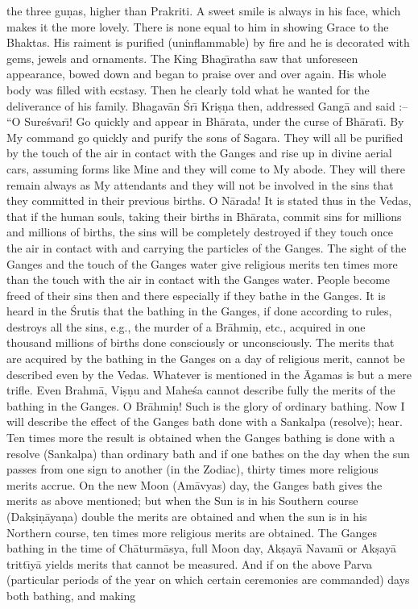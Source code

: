 the three gu\d{n}as, higher than Prakriti. A sweet smile is always in his face, which makes it the more lovely. There is none equal to him in showing Grace to the Bhaktas. His raiment is purified (uninflammable) by fire and he is decorated with gems, jewels and ornaments. The King Bhag\={\i}ratha saw that unforeseen appearance, bowed down and began to praise over and over again. His whole body was filled with ecstasy. Then he clearly told what he wanted for the deliverance of his family. Bhagav\=an \'Sr\={\i} Kri\d{s}\d{n}a then, addressed Gang\=a and said :-- ``O Sure\'svar\={\i}! Go quickly and appear in Bh\=arata, under the curse of Bh\=arat\={\i}. By My command go quickly and purify the sons of Sagara. They will all be purified by the touch of the air in contact with the Ganges and rise up in divine aerial cars, assuming forms like Mine and they will come to My abode. They will there remain always as My attendants and they will not be involved in the sins that they committed in their previous births. O N\=arada! It is stated thus in the Vedas, that if the human souls, taking their births in Bh\=arata, commit sins for millions and millions of births, the sins will be completely destroyed if they touch once the air in contact with and carrying the particles of the Ganges. The sight of the Ganges and the touch of the Ganges water give religious merits ten times more than the touch with the air in contact with the Ganges water. People become freed of their sins then and there especially if they bathe in the Ganges. It is heard in the \'Srutis that the bathing in the Ganges, if done according to rules, destroys all the sins, e.g., the murder of a Br\=ahmi\d{n}, etc., acquired in one thousand millions of births done consciously or unconsciously. The merits that are acquired by the bathing in the Ganges on a day of religious merit, cannot be described even by the Vedas. Whatever is mentioned in the \=Agamas is but a mere trifle. Even Brahm\=a, Vi\d{s}\d{n}u and Mahe\'sa cannot describe fully the merits of the bathing in the Ganges. O Br\=ahmi\d{n}! Such is the glory of ordinary bathing. Now I will describe the effect of the Ganges bath done with a Sankalpa (resolve); hear. Ten times more the result is obtained when the Ganges bathing is done with a resolve (Sankalpa) than ordinary bath and if one bathes on the day when the sun passes from one sign to another (in the Zodiac), thirty times more religious merits accrue. On the new Moon (Am\=avyas) day, the Ganges bath gives the merits as above mentioned; but when the Sun is in his Southern course (Dak\d{s}i\d{n}\=aya\d{n}a) double the merits are obtained and when the sun is in his Northern course, ten times more religious merits are obtained. The Ganges bathing in the time of Ch\=aturm\=asya, full Moon day, Ak\d{s}ay\=a Navam\={\i} or Ak\d{s}ay\=a tritt\={\i}y\=a yields merits that cannot be measured. And if on the above Parva (particular periods of the year on which certain ceremonies are commanded) days both bathing, and making


